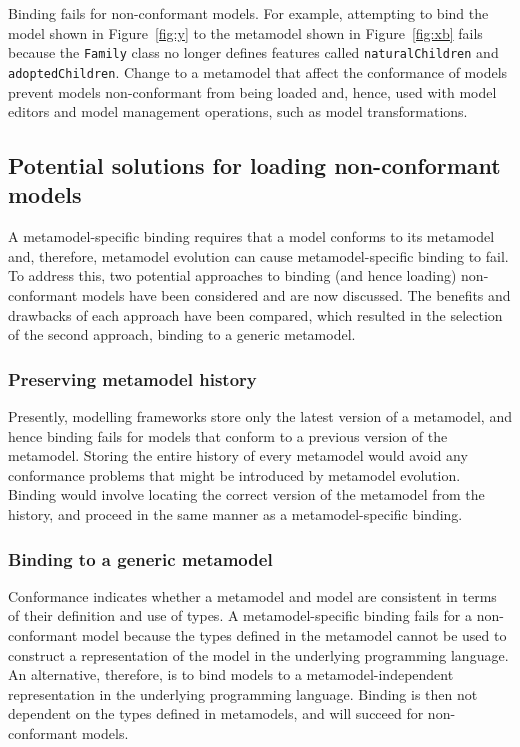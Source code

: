 Binding fails for non-conformant models. For example, attempting to bind the model shown in Figure~\ref{fig:y} to the metamodel shown in Figure~\ref{fig:xb} fails because the \texttt{Fa\-mi\-ly} class no longer defines features called  \texttt{na\-tu\-r\-alCh\-il\-dr\-en} and \texttt{ad\-op\-t\-edCh\-il\-dr\-en}. Change to a metamodel that affect the conformance of models prevent models non-conformant from being loaded and, hence, used with model editors and model management operations, such as model transformations.



\subsection{Potential solutions for loading non-conformant models}
A metamodel-specific binding requires that a model conforms to its metamodel and, therefore, metamodel evolution can cause metamodel-specific binding to fail. To address this, two potential approaches to binding (and hence loading) non-conformant models have been considered and are now discussed. The benefits and drawbacks of each approach have been compared, which resulted in the selection of the second approach, binding to a generic metamodel.

\subsubsection{Preserving metamodel history}
Presently, modelling frameworks store only the latest version of a metamodel, and hence binding fails for models that conform to a previous version of the metamodel. Storing the entire history of every metamodel would avoid any conformance problems that might be introduced by metamodel evolution. Binding would involve locating the correct version of the metamodel from the history, and proceed in the same manner as a metamodel-specific binding.  

\subsubsection{Binding to a generic metamodel}
Conformance indicates whether a metamodel and model are consistent in terms of their definition and use of types. A metamodel-specific binding fails for a non-conformant model because the types defined in the metamodel cannot be used to construct a representation of the model in the underlying programming language. An alternative, therefore, is to bind models to a metamodel-independent representation in the underlying programming language. Binding is then not dependent on the types defined in metamodels, and will succeed for non-conformant models.
   
